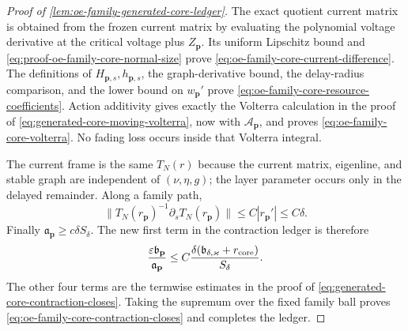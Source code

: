 \begin{proof}[Proof of
\cref{lem:oe-family-generated-core-ledger}]
The exact quotient current matrix is obtained from the frozen current
matrix by evaluating the polynomial voltage derivative at the critical
voltage plus \(Z_{\mathbf p}\).  Its uniform Lipschitz bound and
\cref{eq:proof-oe-family-core-normal-size} prove
\cref{eq:oe-family-core-current-difference}.  The definitions of
\(H_{\mathbf p,s},h_{\mathbf p,s}\), the graph-derivative bound, the
delay-radius comparison, and the lower bound on \(w_{\mathbf p}'\) prove
\cref{eq:oe-family-core-resource-coefficients}.  Action additivity gives
exactly the Volterra calculation in the proof of
\cref{eq:generated-core-moving-volterra}, now with
\(\mathscr A_{\mathbf p}\), and proves
\cref{eq:oe-family-core-volterra}.  No fading loss occurs inside that
Volterra integral.

The current frame is the same \(T_N(r)\) because the current matrix,
eigenline, and stable graph are independent of \((\nu,\eta,g)\); the
layer parameter occurs only in the delayed remainder.  Along a family
path,
\begin{equation}
 \|T_N(r_{\mathbf p})^{-1}
      \partial_sT_N(r_{\mathbf p})\|
 \le C|r_{\mathbf p}'|\le C\delta.             \label{eq:proof-oe-family-core-frame-rate}
\end{equation}
Finally \(\mathfrak a_{\mathbf p}\ge c\delta S_\delta\).  The new first
term in the contraction ledger is therefore
\begin{equation}
 \frac{\varepsilon\mathfrak b_{\mathbf p}}
      {\mathfrak a_{\mathbf p}}
 \le C\frac{\delta
       (\mathfrak b_{\delta,\varkappa}+r_{\rm core})}
       {S_\delta}.                              \label{eq:proof-oe-family-core-new-smallness}
\end{equation}
The other four terms are the termwise estimates in the proof of
\cref{eq:generated-core-contraction-closes}.  Taking the supremum over the
fixed family ball proves
\cref{eq:oe-family-core-contraction-closes} and completes the ledger.
\end{proof}

